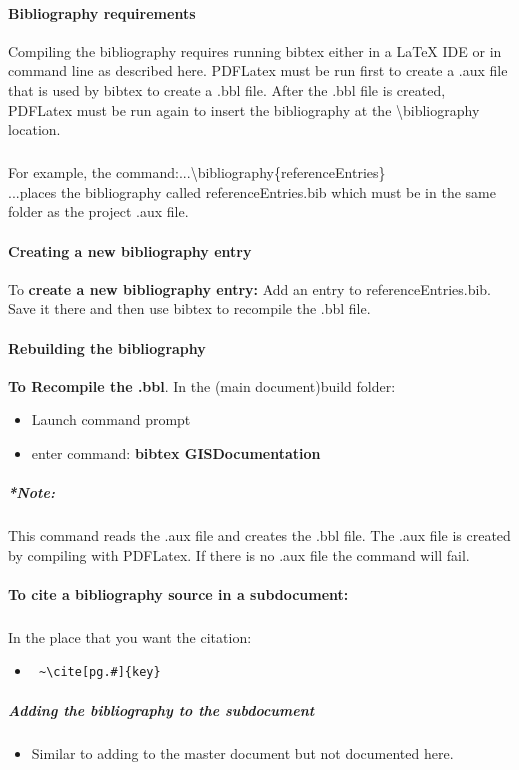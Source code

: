 \documentclass[class=book , crop=false]{standalone}
\begin{document}
\paragraph{Bibliography requirements}
Compiling the bibliography requires running bibtex either in a \LaTeX{} IDE or in command line as described here.  PDFLatex must be run first to create a .aux file that is used by bibtex to create a .bbl file.  After the .bbl file is created, PDFLatex must be run again to insert the bibliography at the \textbackslash bibliography location.
\subparagraph*{}
For example, the command:...\textbackslash bibliography\{referenceEntries\}\\
...places the bibliography called referenceEntries.bib which must be in the same folder as the project .aux file.
\paragraph{Creating a new bibliography entry}
To \textbf{create a new bibliography entry:} Add an entry to referenceEntries.bib.  Save it there and then use bibtex to recompile the .bbl file.
\paragraph{Rebuilding the bibliography}
\textbf{To Recompile the .bbl}.  In the (main document)build folder:
\begin{itemize}
\item Launch command prompt
\item enter command: \textbf{{\large bibtex GISDocumentation}}
\end{itemize}
\subparagraph*{*Note:} {\footnotesize This command reads the .aux file and creates the .bbl file.  The .aux file is created by compiling with PDFLatex.  If there is no .aux file the command will fail.}

\paragraph{To cite a bibliography source in a subdocument:}
\subparagraph{}In the place that you want the citation:
\begin{itemize}
\item \begin{verbatim} ~\cite[pg.#]{key}\end{verbatim}
\end{itemize}
\subparagraph{Adding the bibliography to the subdocument}
\begin{itemize}
\item Similar to adding to the master document but not documented here.
\end{itemize}
\end{document}
